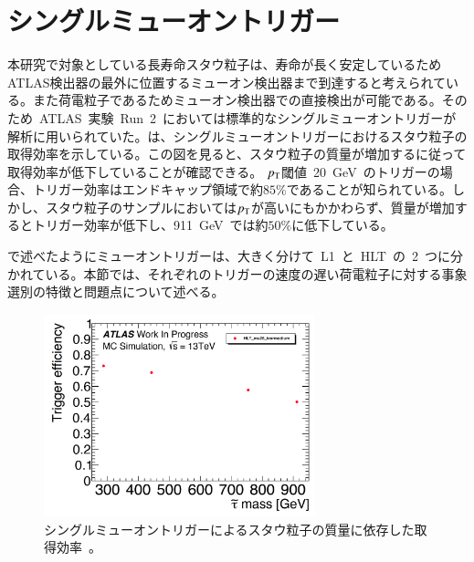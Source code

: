 \section{シングルミューオントリガー}
\label{sec:single}
本研究で対象としている長寿命スタウ粒子は、寿命が長く安定しているためATLAS検出器の最外に位置するミューオン検出器まで到達すると考えられている。また荷電粒子であるためミューオン検出器での直接検出が可能である。そのため~ATLAS~実験~Run~2~においては標準的なシングルミューオントリガーが解析に用いられていた。は、シングルミューオントリガーにおけるスタウ粒子の取得効率を示している。この図を見ると、スタウ粒子の質量が増加するに従って取得効率が低下していることが確認できる。
$p_{\rm{T}}$閾値~20~GeV~のトリガーの場合、トリガー効率はエンドキャップ領域で約$85\%$であることが知られている。しかし、スタウ粒子のサンプルにおいては$p_{\rm{T}}$が高いにもかかわらず、質量が増加するとトリガー効率が低下し、911~GeV~では約$50\%$に低下している。

で述べたようにミューオントリガーは、大きく分けて~L1~と~HLT~の~2~つに分かれている。本節では、それぞれのトリガーの速度の遅い荷電粒子に対する事象選別の特徴と問題点について述べる。

\begin{figure}[tbp]
        \centering   
        \includegraphics[width=0.7\textwidth,page=1]{img/pdf3/sumi.pdf}
        \caption[シングルミューオントリガーによるスタウ粒子の質量に依存した取得効率]{シングルミューオントリガーによるスタウ粒子の質量に依存した取得効率~\cite{MT:01}。}
        \label{fig:sumi1}
\end{figure}

